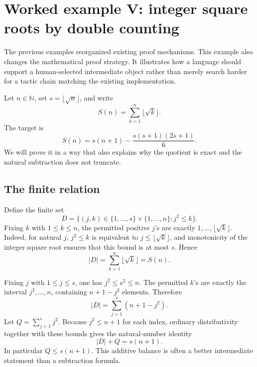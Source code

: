 \documentclass[11pt,a4paper]{article}
\newcommand{\N}{\mathbb N}
\theoremstyle{remark}
\begin{document}
\section{Worked example V: integer square roots by double counting}\label{sec:sqrt}

The previous examples reorganized existing proof mechanisms. This example also changes the mathematical proof strategy. It illustrates how a language should support a human-selected intermediate object rather than merely search harder for a tactic chain matching the existing implementation.

Let \(n\in\N\), set \(s=\lfloor\sqrt n\rfloor\), and write
\[
 S(n)=\sum_{k=1}^{n}\lfloor\sqrt k\rfloor.
\]
The target is
\begin{equation}\label{eq:sqrt}
 S(n)=s(n+1)-\frac{s(s+1)(2s+1)}6.
\end{equation}
We will prove it in a way that also explains why the quotient is exact and the natural subtraction does not truncate.

\subsection{The finite relation}

Define the finite set
\[
 D=\{(j,k)\in\{1,\ldots,s\}\times\{1,\ldots,n\}:j^2\le k\}.
\]
Fixing \(k\) with \(1\le k\le n\), the permitted positive \(j\)'s are exactly
\(1,\ldots,\lfloor\sqrt k\rfloor\). Indeed, for natural \(j\),
\(j^2\le k\) is equivalent to \(j\le\lfloor\sqrt k\rfloor\), and monotonicity of the integer square root ensures that this bound is at most \(s\). Hence
\begin{equation}\label{eq:countk}
 |D|=\sum_{k=1}^{n}\lfloor\sqrt k\rfloor=S(n).
\end{equation}

Fixing \(j\) with \(1\le j\le s\), one has \(j^2\le s^2\le n\). The permitted \(k\)'s are exactly the interval \(j^2,\ldots,n\), containing \(n+1-j^2\) elements. Therefore
\begin{equation}\label{eq:countj}
 |D|=\sum_{j=1}^{s}(n+1-j^2).
\end{equation}
Let \(Q=\sum_{j=1}^{s}j^2\). Because \(j^2\le n+1\) for each index, ordinary distributivity together with these bounds gives the natural-number identity
\begin{equation}\label{eq:sqrtbalance}
 |D|+Q=s(n+1).
\end{equation}
In particular \(Q\le s(n+1)\). This additive balance is often a better intermediate statement than a subtraction formula.
\end{document}
